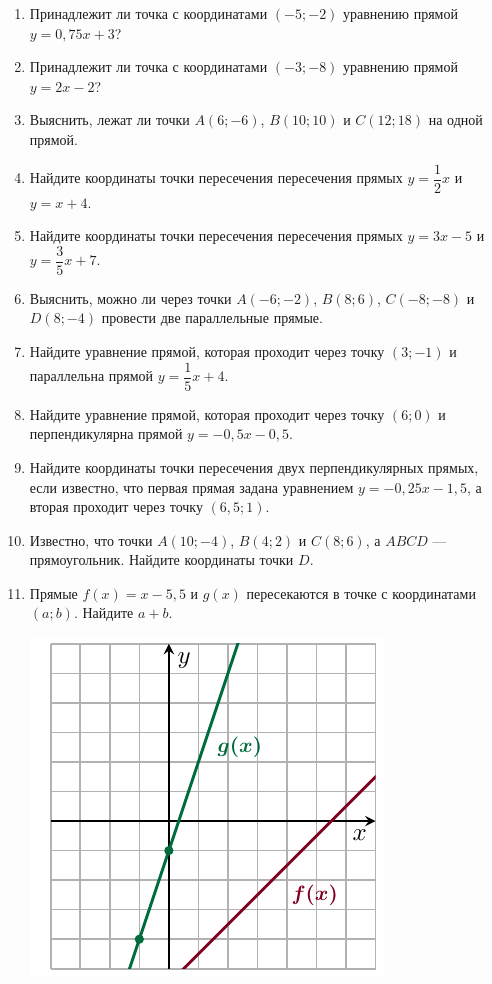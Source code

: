 \documentclass[10pt, a4paper]{article}
\begin{document}

\begin{enumerate}
	\item Принадлежит ли точка с координатами $(-5;-2)$ уравнению прямой $y=0,75x+3$?
	\item Принадлежит ли точка с координатами $(-3;-8)$ уравнению прямой $y=2x-2$?
	\item Выяснить, лежат ли точки $A(6;-6)$, $B(10;10)$ и $C(12;18)$ на одной прямой.
	\item Найдите координаты точки пересечения пересечения прямых $y=\dfrac{1}{2}x$ и $y=x+4$.
	\item Найдите координаты точки пересечения пересечения прямых $y=3x-5$ и $y=\dfrac{3}{5}x+7$.
	\item Выяснить, можно ли через точки $A(-6;-2)$, $B(8;6)$, $C(-8;-8)$ и $D(8;-4)$ провести две параллельные прямые.
	\item Найдите уравнение прямой, которая проходит через точку $(3;-1)$ и параллельна прямой $y=\dfrac{1}{5}x+4$.
	\item Найдите уравнение прямой, которая проходит через точку $(6;0)$ и перпендикулярна прямой $y=-0,5x-0,5$.
	\item Найдите координаты точки пересечения двух перпендикулярных прямых, если известно, что первая прямая задана уравнением $y=-0,25x-1,5$, а вторая проходит через точку $(6,5;1)$.
	\item Известно, что точки $A(10;-4)$, $B(4;2)$ и $C(8;6)$, а $ABCD$ --- прямоугольник. Найдите координаты точки $D$.
	\item
	\begin{minipage}[t]{0.6\textwidth}
		 Прямые $f(x)=x-5,5$ и $g(x)$ пересекаются в точке с координатами $(a;b)$. Найдите $a+b$.
	\end{minipage}
	\begin{minipage}[t]{0.3\textwidth}
		\includegraphics[align=t, width=\textwidth]{graph_6}
	\end{minipage}
\end{enumerate}
\end{document}
